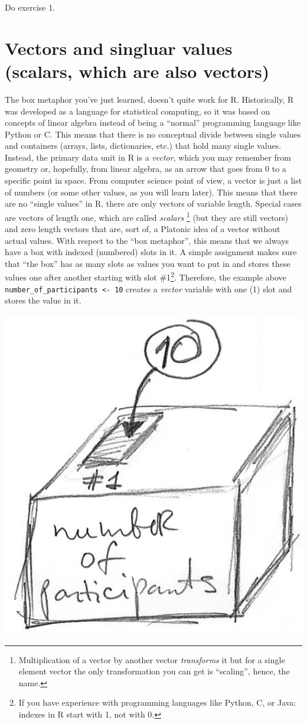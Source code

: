 \documentclass[
]{book}
\begin{document}
Do exercise 1.

\hypertarget{vectors-scalars}{%
\section{Vectors and singluar values (scalars, which are also vectors)}\label{vectors-scalars}}

The box metaphor you've just learned, doesn't quite work for R. Historically, R was developed as a language for statistical computing, so it was based on concepts of linear algebra instead of being a ``normal'' programming language like Python or C. This means that there is no conceptual divide between single values and containers (arrays, lists, dictionaries, etc.) that hold many single values. Instead, the primary data unit in R is a \emph{vector}, which you may remember from geometry or, hopefully, from linear algebra, as an arrow that goes from 0 to a specific point in space. From computer science point of view, a vector is just a list of numbers (or some other values, as you will learn later). This means that there are no ``single values'' in R, there are only vectors of variable length. Special cases are vectors of length one, which are called \emph{scalars} \footnote{Multiplication of a vector by another vector \emph{transforms} it but for a single element vector the only transformation you can get is ``scaling'', hence, the name.} (but they are still vectors) and zero length vectors that are, sort of, a Platonic idea of a vector without actual values. With respect to the ``box metaphor'', this means that we always have a box with indexed (numbered) slots in it. A simple assignment makes sure that ``the box'' has as many slots as values you want to put in and stores these values one after another starting with slot \#1\footnote{If you have experience with programming languages like Python, C, or Java: indexes in R start with 1, not with 0.}. Therefore, the example above \texttt{number\_of\_participants\ \textless{}-\ 10} creates a \emph{vector} variable with one (1) slot and stores the value in it.

\begin{center}\includegraphics[width=0.3\linewidth]{images/box-with-a-slot} \end{center}
\end{document}
